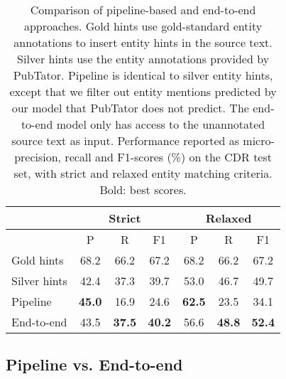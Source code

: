 \documentclass[11pt]{article}
\begin{document}
\begin{table}[t]
\centering
\caption{Comparison of pipeline-based and end-to-end approaches. Gold hints use gold-standard entity annotations to insert entity hints in the source text. Silver hints use the entity annotations provided by PubTator. Pipeline is identical to silver entity hints, except that we filter out entity mentions predicted by our model that PubTator does not predict. The end-to-end model only has access to the unannotated source text as input. Performance reported as micro-precision, recall and F1-scores (\%) on the CDR test set, with strict and relaxed entity matching criteria. Bold: best scores.}
\label{tab:05}
\small
\begin{tabular}{@{}lcccccc@{}}
\toprule
             & \multicolumn{3}{c}{Strict}                    & \multicolumn{3}{c}{Relaxed}                   \\ \midrule
             & P             & R             & F1            & P             & R             & F1            \\ \cmidrule(l){2-7} 
Gold hints   & 68.2          & 66.2          & 67.2          & 68.2          & 66.2          & 67.2          \\ \midrule
Silver hints & 42.4          & 37.3          & 39.7          & 53.0          & 46.7          & 49.7          \\
Pipeline     & \textbf{45.0} & 16.9          & 24.6          & \textbf{62.5} & 23.5          & 34.1          \\
End-to-end   & 43.5          & \textbf{37.5} & \textbf{40.2} & 56.6          & \textbf{48.8} & \textbf{52.4} \\ \bottomrule
\end{tabular}
\vspace{-2mm}
\end{table}

\subsection{Pipeline vs. End-to-end} \label{pipeline-vs-end-to-end}
\end{document}
